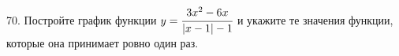 70. Постройте график функции $y=\cfrac{3x^2-6x}{|x-1|-1}$ и укажите те значения функции, которые она принимает ровно один раз.\\
